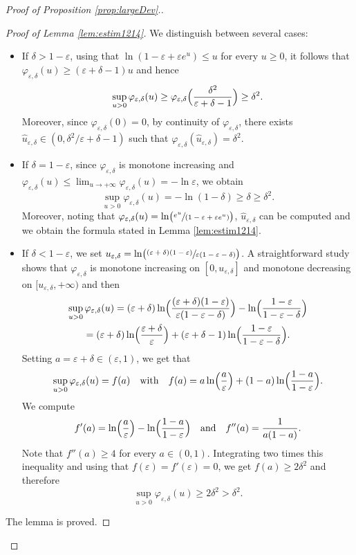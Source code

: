 \documentclass[JEP,XML,SOM,Unicode, NoEqCountersInSection,NoFloatCountersInSection,published]{cedram}
\newcommand{\spfrac}[2]{\sfrac{#1}{(#2)}}
\theoremstyle{definition}
\begin{document}
\begin{proof}[Proof of Proposition \ref{prop:largeDev}.]
\begin{proof}[Proof of Lemma \ref{lem:estim1214}]
We distinguish between several cases:
\begin{itemize}
\item If $\delta>1-\varepsilon$, using that $\ln (1-\varepsilon+\varepsilon e^u)\leq u$ for every $u\geq 0$, it follows that $\varphi_{\varepsilon,\delta}(u)\geq (\varepsilon+\delta-1)u$ and hence
\[
\sup_{u >0}\varphi_{\varepsilon,\delta}(u)\geq \varphi_{\varepsilon,\delta}\Bigl(\frac{\delta^2}{\varepsilon+\delta-1}\Bigr)\geq \delta^2.
\]
Moreover, since $\varphi_{\varepsilon,\delta}(0)=0$, by continuity of $\varphi_{\varepsilon,\delta}$, there exists $\hat u_{\varepsilon,\delta}\in (0,\delta^2/\varepsilon+\delta-1)$ such that $\varphi_{\varepsilon,\delta}(\hat u_{\varepsilon,\delta})=\delta^2$.
\item If $\delta=1-\varepsilon$, since $\varphi_{\varepsilon,\delta}$ is monotone increasing and $\varphi_{\varepsilon,\delta}(u)\leq \lim_{u\rightarrow+\infty}\varphi_{\varepsilon,\delta}(u)=-\ln \varepsilon$, we obtain
\[
\sup_{u >0}\varphi_{\varepsilon,\delta}(u)=-\ln (1-\delta)\geq \delta\geq \delta^2.
\]
Moreover, noting that $\varphi_{\varepsilon,\delta}(u)=\ln \bigl(\spfrac{e^u}{1-\varepsilon+\varepsilon e^u}\bigr)$, $\hat u_{\varepsilon,\delta}$ can be computed and we obtain the formula stated in Lemma \ref{lem:estim1214}.
\item If $\delta <1-\varepsilon$, we set $u_{\varepsilon,\delta}=\ln \bigl(\sfrac{(\varepsilon+\delta)(1-\varepsilon)}{\varepsilon (1-\varepsilon-\delta)}\bigr)$. A straightforward study shows that $\varphi_{\varepsilon,\delta}$ is monotone increasing on $[0,u_{\varepsilon,\delta}]$ and monotone decreasing on $[u_{\varepsilon,\delta},+\infty)$ and then
\begin{multline*}
\sup_{u >0}\varphi_{\varepsilon,\delta}(u)=(\varepsilon+\delta)\ln \Bigl(\frac{(\varepsilon+\delta)(1-\varepsilon)}{\varepsilon (1-\varepsilon-\delta)}\Bigr)-\ln \Bigl(\frac{1-\varepsilon}{1-\varepsilon-\delta}\Bigr)\\
= (\varepsilon+\delta)\ln \Bigl(\frac{\varepsilon+\delta}{\varepsilon}\Bigr)+(\varepsilon+\delta-1)\ln \Bigl(\frac{1-\varepsilon}{1-\varepsilon-\delta}\Bigr).
\end{multline*}
Setting $a = \varepsilon + \delta\in (\varepsilon,1)$, we get that
\[
\sup_{u >0}\varphi_{\varepsilon,\delta}(u)= f(a)\quad \text{with}\quad f(a)=a \ln\Bigl(\frac{a}{\varepsilon}\Bigr) + (1-a) \ln\Bigl(\frac{1- a}{1-\varepsilon}\Bigr).
\]
We compute
\[
f'(a) = \ln\Bigl(\frac{a}{\varepsilon}\Bigr) - \ln\Bigl(\frac{1- a}{1-\varepsilon}\Bigr)\quad \text{and}\quad
f''(a) = \frac{1}{ a(1-a)}.
\]
Note that $f''(a)\geq 4$ for every $a\in (0,1)$. Integrating two times this inequality and using that $f(\varepsilon)=f'(\varepsilon)=0$, we get $f(a)\geq 2\delta^2$ and therefore
\[
\sup_{u >0}\varphi_{\varepsilon,\delta}(u)\geq 2\delta^2>\delta^2.
\]
\end{itemize}
The lemma is proved.
\end{proof}


\end{proof}
\end{document}
